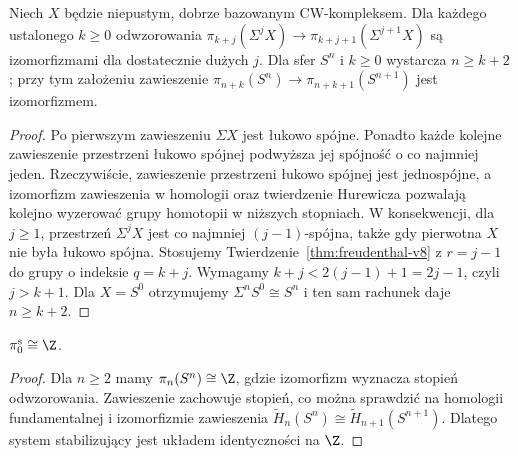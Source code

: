 \begin{twierdzenie}
\label{thm:stable-range-v8}
Niech $X$ będzie niepustym, dobrze bazowanym
CW-kompleksem. Dla każdego ustalonego $k\ge0$
odwzorowania
$\pi_{k+j}(\Sigma^j X)\to
\pi_{k+j+1}(\Sigma^{j+1}X)$
są izomorfizmami dla dostatecznie dużych $j$.
Dla sfer $S^n$ i $k\ge0$ wystarcza $n\ge k+2$;
przy tym założeniu zawieszenie
$\pi_{n+k}(S^n)\to\pi_{n+k+1}(S^{n+1})$
jest izomorfizmem.
\end{twierdzenie}
\begin{proof}
Po pierwszym zawieszeniu $\Sigma X$ jest łukowo spójne.
Ponadto każde kolejne zawieszenie przestrzeni
łukowo spójnej podwyższa jej spójność o co najmniej
jeden. Rzeczywiście, zawieszenie przestrzeni
łukowo spójnej jest jednospójne, a izomorfizm
zawieszenia w homologii oraz twierdzenie Hurewicza
pozwalają kolejno wyzerować grupy homotopii
w niższych stopniach. W konsekwencji, dla $j\ge1$,
przestrzeń $\Sigma^jX$ jest co najmniej
$(j-1)$-spójna, także gdy pierwotna $X$
nie była łukowo spójna.
Stosujemy Twierdzenie~\ref{thm:freudenthal-v8}
z $r=j-1$ do grupy o indeksie $q=k+j$.
Wymagamy $k+j<2(j-1)+1=2j-1$, czyli $j>k+1$.
Dla $X=S^0$ otrzymujemy $\Sigma^nS^0\cong S^n$
i ten sam rachunek daje $n\ge k+2$.
\end{proof}

\begin{wniosek}
$\pi_0^{\mathrm s}\cong\Z$.
\end{wniosek}
\begin{proof}
Dla $n\ge2$ mamy $\pi_n(S^n)\cong\Z$,
gdzie izomorfizm wyznacza stopień odwzorowania.
Zawieszenie zachowuje stopień, co można sprawdzić
na homologii fundamentalnej i izomorfizmie zawieszenia
$\widetilde H_n(S^n)\cong\widetilde H_{n+1}(S^{n+1})$.
Dlatego system stabilizujący jest układem identyczności
na $\Z$.
\end{proof}


